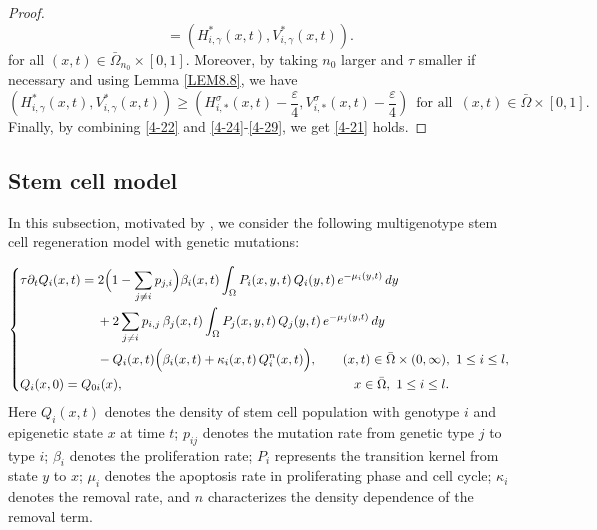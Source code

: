 \documentclass[11pt,reqno]{amsart}
\numberwithin{equation}{section}
\begin{document}
\begin{proof}
\begin{equation}
=
\left( H_{i,\gamma}^{*}(x,t), V_{i,\gamma}^{*}(x,t) \right).
\end{equation}
for all $(x,t)\in\bar{\Omega}_{n_{0}}\times[0,1]$.
Moreover, by taking $n_{0}$ larger and $\tau$ smaller if necessary and using Lemma \ref{LEM8.8}, we have
\begin{equation}\label{4-29}
\left( H_{i,\gamma}^{*}(x,t), V_{i,\gamma}^{*}(x,t) \right)
\geq
\left(
H_{i,*}^{\sigma}(x,t) - \frac{\varepsilon}{4}, V_{i,*}^{\sigma}(x,t) -\frac{\varepsilon}{4} \right)
\enspace \text{for all}\enspace (x,t)\in\bar{\Omega}\times[0,1].
\end{equation}
Finally, by combining \eqref{4-22} and \eqref{4-24}-\eqref{4-29}, we get \eqref{4-21} holds.
\end{proof}


\subsection{Stem cell model}
In this subsection, motivated by \cite{Lei1,Lei2,SLLW}, we consider the following
multigenotype stem cell regeneration model with genetic mutations:

\begin{equation}\label{4-30}
\left\{
\begin{aligned}
&\tau \partial_t Q_i(x,t)
= 2\Bigl(1-\sum_{j\ne i} p_{j,i}\Bigr)\beta_i(x,t)
   \int_{\Omega} P_i(x,y,t)\,Q_i(y,t)\,e^{-\mu_i(y,t)}\,dy \\
&\hspace{2.1cm} + 2\sum_{j\ne i} p_{i,j}\,\beta_j(x,t)
   \int_{\Omega} P_j(x,y,t)\,Q_j(y,t)\,e^{-\mu_j(y,t)}\,dy \\
&\hspace{2.1cm} - Q_i(x,t)\Bigl(\beta_i(x,t)+\kappa_i(x,t)\,Q_i^{n}(x,t)\Bigr),
\qquad (x,t)\in \bar{\Omega}\times(0,\infty),\ 1\le i\le l,\\
& Q_i(x,0) = Q_{0i}(x), \hspace{6.3cm} x\in\bar{\Omega},\ 1\le i\le l.
\end{aligned}
\right.
\end{equation}
Here $Q_{i}(x,t)$ denotes the density of stem cell population with genotype $i$ and epigenetic state $x$ at time $t$;
$p_{ij}$ denotes the mutation rate from genetic type $j$ to type $i$;
$\beta_{i}$ denotes the proliferation rate;
$P_{i}$ represents the transition kernel from state $y$ to $x$;
$\mu_{i}$ denotes the apoptosis rate in proliferating
phase and cell cycle;
$\kappa_{i}$ denotes the removal rate, and $n$ characterizes the density dependence of the removal term.
\end{document}
